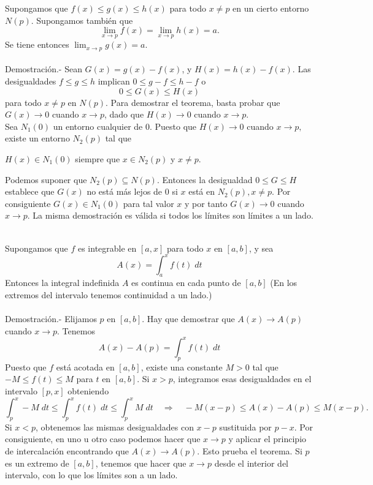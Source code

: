 \begin{teo}
    Supongamos que $f(x)\leq g(x)\leq h(x)$ para todo $x\neq p$ en un cierto entorno $N(p)$. Supongamos también que 
    $$\lim_{x\to p}f(x)=\lim_{x\to p}h(x)=a.$$
    Se tiene entonces $\lim_{x\to p}g(x)=a.$\\\\
	Demostración.-\; Sean $G(x)=g(x)-f(x)$, y $H(x)=h(x)-f(x)$. Las desigualdades $f\leq g\leq h$ implican $0\leq g-f\leq h-f$ o
	$$0\leq G(x)\leq H(x)$$
	para todo $x\neq p$ en $N(p)$. Para demostrar el teorema, basta probar que $G(x)\to 0$ cuando $x\to p$, dado que $H(x)\to 0$ cuando $x\to p$.\\
	Sea $N_1(0)$ un entorno cualquier de $0$. Puesto que $H(x)\to 0$ cuando $x\to p,$ existe un entorno $N_2(p)$ tal que 
	\begin{center}
	    $H(x) \in N_1(0)$ siempre que $x\in N_2(p)$ y $x\neq p.$
	\end{center}
	    Podemos suponer que $N_2(p) \subseteq N(p)$. Entonces la desigualdad $0\leq G \leq H$ establece que $G(x)$ no está más lejos de $0$ si $x$ está en $N_2(p), x\neq p$. Por consiguiente $G(x)\in N_1(0)$ para tal valor $x$ y por tanto $G(x)\to 0$ cuando $x\to p$. La misma demostración es válida si todos los límites son límites a un lado.\\\\
\end{teo}

\begin{teo}
    Supongamos que $f$ es integrable en $[a,x]$ para todo $x$ en $[a,b]$, y sea
    $$A(x)=\int_a^x f(t)\; dt$$
    Entonces la integral indefinida $A$ es continua en cada punto de $[a,b]$ (En los extremos del intervalo tenemos continuidad a un lado.)\\\\
	Demostración.-\; Elijamos $p$ en $[a,b]$. Hay que demostrar que $A(x)\to A(p)$ cuando $x\to p.$ Tenemos
	$$A(x)-A(p)=\int_p^x f(t)\; dt$$
	Puesto que $f$ está acotada en $[a,b]$, existe una constante $M>0$ tal que $-M\leq f(t)\leq M$ para $t$ en $[a,b]$. Si $x>p$, integramos esas desigualdades en el intervalo $[p,x]$ obteniendo
	$$\int_p^x -M \;dt \leq \int_p^x f(t)\; dt\leq \int_p^x M \; dt \quad \Longrightarrow \quad -M(x-p)\leq A(x)-A(p)\leq M(x-p).$$
	Si $x<p$, obtenemos las mismas desigualdades con $x-p$ sustituida por $p-x$. Por consiguiente, en uno u otro caso podemos hacer que $x\to p$ y aplicar el principio de intercalación encontrando que $A(x)\to A(p)$. Esto prueba el teorema. Si $p$ es un extremo de $[a,b]$, tenemos que hacer que $x\to p$ desde el interior del intervalo, con lo que los límites son a un lado.
\end{teo}


